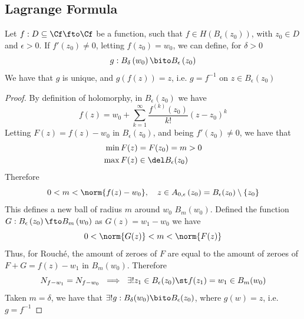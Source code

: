 \documentclass[../mmf.tex]{subfiles}
\begin{document}
\subsection{Lagrange Formula}
\begin{thm}
	Let $f:D\subseteq\Cf\fto\Cf$ be a function, such that $f\in H\left( B_{\epsilon}\left( z_0 \right) \right)$, with $z_0\in D$ and $\epsilon>0$. If $f'(z_0)\ne0$, letting $f(z_0)=w_0$, we can define, for $\delta>0$
	\begin{equation*}
		g:B_{\delta}\left( w_0 \right)\bito B_{\epsilon}\left( z_0 \right)
	\end{equation*}
	We have that $g$ is unique, and $g\left( f\left( z \right) \right)=z$, i.e. $g=f^{-1}$ on $z\in B_{\epsilon}\left( z_0 \right)$
\end{thm}
\begin{proof}
	By definition of holomorphy, in $B_{\epsilon}\left( z_0 \right)$ we have
	\begin{equation*}
		f(z)=w_0+\sum_{k=1}^{\infty}\frac{f^{(k)}(z_0)}{k!}\left( z-z_0 \right)^k
	\end{equation*}
	Letting $F(z)=f(z)-w_{0}$ in $B_{\epsilon}(z_0)$, and being $f'(z_0)\ne0$, we have that
	\begin{equation*}
		\begin{aligned}
			\min F(z)&= F(z_0)=m>0\\
			\max F(z)&\in \del B_{\epsilon}(z_0)
		\end{aligned}
	\end{equation*}
	Therefore
	\begin{equation*}
		0<m<\norm{f(z)-w_0}, \quad z\in A_{0, \epsilon}\left( z_0 \right)=B_{\epsilon}(z_0)\setminus\left\{ z_0 \right\}
	\end{equation*}
	This defines a new ball of radius $m$ around $w_0$ $B_{m}(w_0)$. Defined the function $G:B_{\epsilon}\left( z_0 \right)\fto B_{m}\left( w_0 \right)$ as $G(z)=w_1-w_0$ we have
	\begin{equation*}
		0<\norm{G(z)}<m<\norm{F(z)}
	\end{equation*}
	Thus, for Rouché, the amount of zeroes of $F$ are equal to the amount of zeroes of $F+G=f(z)-w_1$ in $B_{m}(w_0)$. Therefore
	\begin{equation*}
		N_{f-w_1}=N_{f-w_0}\ \implies{}\ \exists!z_1\in B_{\epsilon}(z_0)\st f(z_1)=w_1\in B_{m}(w_0)
	\end{equation*}
	Taken $m=\delta$, we have that $\exists! g:B_{\delta}(w_0)\bito B_{\epsilon}(z_0)$, where $g(w)=z$, i.e. $g=f^{-1}$
\end{proof}
\end{document}
